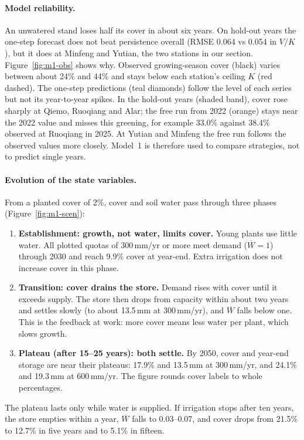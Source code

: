 \paragraph{Model reliability.} An unwatered stand loses half its cover in about six years. On hold-out years the one-step forecast does not beat persistence overall (RMSE 0.064 vs 0.054 in $V/K$), but it does at Minfeng and Yutian, the two stations in our section. Figure~\ref{fig:m1-obs} shows why. Observed growing-season cover (black) varies between about 24\% and 44\% and stays below each station's ceiling $K$ (red dashed). The one-step predictions (teal diamonds) follow the level of each series but not its year-to-year spikes. In the hold-out years (shaded band), cover rose sharply at Qiemo, Ruoqiang and Alar; the free run from 2022 (orange) stays near the 2022 value and misses this greening, for example 33.0\% against 38.4\% observed at Ruoqiang in 2025. At Yutian and Minfeng the free run follows the observed values more closely. Model~1 is therefore used to compare strategies, not to predict single years.

\paragraph{Evolution of the state variables.} From a planted cover of 2\%, cover and soil water pass through three phases (Figure~\ref{fig:m1-scen}):
\begin{enumerate}\setlength{\itemsep}{1pt}\setlength{\parsep}{0pt}
  \item \textbf{Establishment: growth, not water, limits cover.} Young plants use little water. All plotted quotas of 300\,mm/yr or more meet demand ($\overline W=1$) through 2030 and reach 9.9\% cover at year-end. Extra irrigation does not increase cover in this phase.
  \item \textbf{Transition: cover drains the store.} Demand rises with cover until it exceeds supply. The store then drops from capacity within about two years and settles slowly (to about 13.5\,mm at 300\,mm/yr), and $\overline W$ falls below one. This is the feedback at work: more cover means less water per plant, which slows growth.
  \item \textbf{Plateau (after 15--25 years): both settle.} By 2050, cover and year-end storage are near their plateaus: 17.9\% and 13.5\,mm at 300\,mm/yr, and 24.1\% and 19.3\,mm at 600\,mm/yr. The figure rounds cover labels to whole percentages.
\end{enumerate}
The plateau lasts only while water is supplied. If irrigation stops after ten years, the store empties within a year, $\overline W$ falls to 0.03--0.07, and cover drops from 21.5\% to 12.7\% in five years and to 5.1\% in fifteen.

